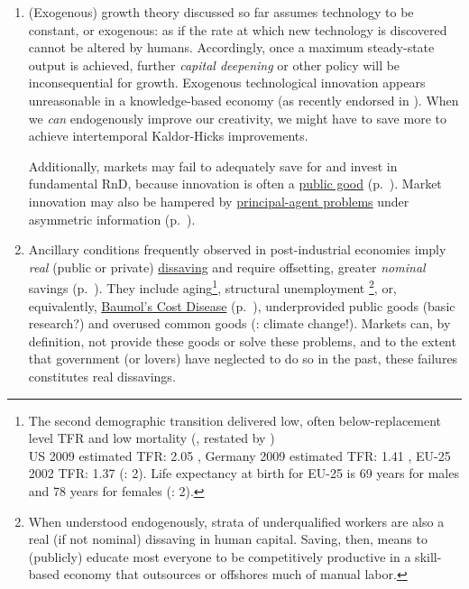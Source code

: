 \begin{enumerate}%
	\item (Exogenous) growth theory discussed so far assumes technology to be constant, or exogenous: as if the rate at which new technology is discovered cannot be altered by humans. Accordingly, once a maximum steady-state output is achieved, further \emph{capital deepening} or other policy will be inconsequential for growth. Exogenous technological innovation appears unreasonable in a knowledge-based economy (as recently endorsed in \citealt{Communities2009}). When we \emph{can} endogenously improve our creativity, we might have to save more to achieve intertemporal Kaldor-Hicks improvements.

	Additionally, markets may fail to adequately save for and invest in fundamental \gls{RnD}, because innovation is often a \hyperref[sec:public-good]{public good} (p.~\pageref{sec:public-good}). Market innovation may also be hampered by \hyperref[sec:principal-agent-problem]{principal-agent problems} under asymmetric information (p.~\pageref{sec:principal-agent-problem}).

	\item Ancillary conditions frequently observed in post-industrial economies imply \emph{real} (public or private) \hyperref[sec:deltanetworth]{dissaving} and require offsetting, greater \emph{nominal} savings (p.~\pageref{sec:deltanetworth}). They include aging\footnote{
		The second demographic transition delivered low, often below-replacement level \gls{TFR} and low mortality (\citealt{Davis1945}, restated by \citealt{Caldwell-1976-aa}) \\ US 2009 estimated \gls{TFR}: 2.05 \citep{CIA2009}, Germany 2009 estimated \gls{TFR}: 1.41 \citep{CIA2009}, EU-25 2002 \gls{TFR}: 1.37 (\citealt{Demeny-2003-aa}: 2). Life expectancy at birth for EU-25 is 69 years for males and 78 years for females (\citealt{Demeny-2003-aa}: 2).},
	structural unemployment \footnote{
		When understood endogenously, strata of underqualified workers are also a real (if not nominal) dissaving in human capital. Saving, then, means to (publicly) educate most everyone to be competitively productive in a skill-based economy that outsources or offshores much of manual labor.},
	or, equivalently, \hyperref[it:non-linearreturns]{Baumol's Cost Disease} (p.~\pageref{it:non-linearreturns}), underprovided public goods (basic research?) and overused common goods (\citealt{Stern-2006-aa}: climate change!). Markets can, by definition, not provide these goods or solve these problems, and to the extent that government (or lovers) have neglected to do so in the past, these failures constitutes real dissavings.


\end{enumerate}
